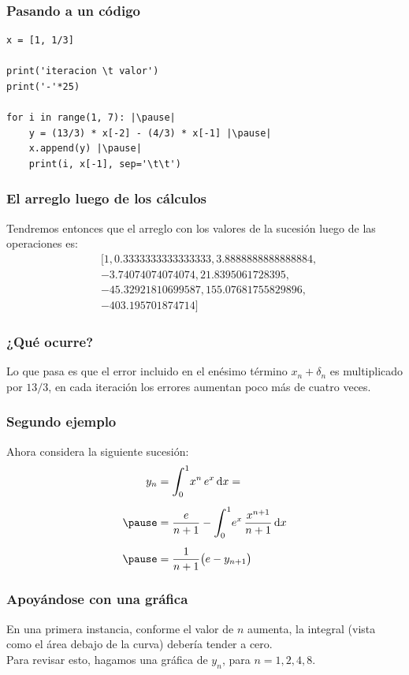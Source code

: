 \documentclass[12pt]{beamer}
\begin{document}
\begin{frame}[fragile]
\frametitle{Pasando a un código}
\begin{lstlisting}[caption=Implementando el código de la sucesión]
x = [1, 1/3]

print('iteracion \t valor')
print('-'*25)

for i in range(1, 7): |\pause|
	y = (13/3) * x[-2] - (4/3) * x[-1] |\pause|
	x.append(y) |\pause|
	print(i, x[-1], sep='\t\t') 
\end{lstlisting}
\end{frame}
\begin{frame}
\frametitle{El arreglo luego de los cálculos}
Tendremos entonces que el arreglo con los valores de la sucesión luego de las operaciones es:
\\
\pause
\begin{align*}
{}&[1,	0.3333333333333333, 3.8888888888888884, \\
{}&-3.74074074074074, 21.8395061728395, \\
{}&-45.32921810699587, 155.07681755829896, \\
{}&-403.195701874714]
\end{align*}
\end{frame}
\begin{frame}
\frametitle{¿Qué ocurre?}
Lo que pasa es que el error incluido en el enésimo término $x_{n} + \delta_{n}$ es multiplicado por $13/3$, \pause en cada iteración los errores aumentan poco más de cuatro veces.
\end{frame}
\begin{frame}
\frametitle{Segundo ejemplo}
Ahora considera la siguiente sucesión:
\pause
\begin{eqnarray*}
\begin{aligned}
y_{n} &= \scaleint{6ex}_{\bs 0}^{1} x^{n} \, e^{x} \dd{x} = \\[0.5em] \pause
&= \dfrac{e}{n+1} - \scaleint{6ex}_{\bs 0}^{1} e^{x} \, \dfrac{x^{n+1}}{n + 1} \dd{x} \\[0.5em] \pause
&= \dfrac{1}{n+1} \big( e - y_{n+1} \big)
\end{aligned}
\end{eqnarray*}
\end{frame}
\begin{frame}
\frametitle{Apoyándose con una gráfica}
En una primera instancia, conforme el valor de $n$ aumenta, la integral (vista como el área debajo de la curva) debería tender a cero.
\\
\bigskip
\pause
Para revisar esto, hagamos una gráfica de $y_{n}$, para $n = 1, 2, 4, 8$.
\end{frame}
\end{document}
